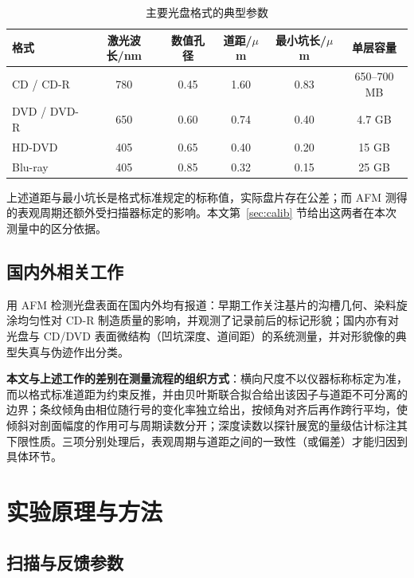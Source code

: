 \documentclass[12pt,a4paper,fontset=windows]{ctexart}
\begin{document}
\begin{table}[H]
\centering
\caption{主要光盘格式的典型参数}
\label{tab:format}
\small
{}
\begin{tabular}{@{}lccccc@{}}
\toprule
格式 & 激光波长/nm & 数值孔径 & 道距/$\mu$m & 最小坑长/$\mu$m & 单层容量 \\
\midrule
CD / CD-R & 780 & 0.45 & 1.60 & 0.83 & 650--700 MB \\
DVD / DVD-R & 650 & 0.60 & 0.74 & 0.40 & 4.7 GB \\
HD-DVD & 405 & 0.65 & 0.40 & 0.20 & 15 GB \\
Blu-ray & 405 & 0.85 & 0.32 & 0.15 & 25 GB \\
\bottomrule
\end{tabular}
\end{table}

上述道距与最小坑长是格式标准规定的标称值，实际盘片存在公差；而 AFM 测得的表观周期还额外受扫描器标定的影响。本文第~\ref{sec:calib} 节给出这两者在本次测量中的区分依据。

\subsection{国内外相关工作}

用 AFM 检测光盘表面在国内外均有报道：早期工作关注基片的沟槽几何、染料旋涂均匀性对 CD-R 制造质量的影响，并观测了记录前后的标记形貌\cite{sunjielin2001}；国内亦有对光盘与 CD/DVD 表面微结构（凹坑深度、道间距）的系统测量\cite{yanyg2005,sunzhi2006}，并对形貌像的典型失真与伪迹作出分类\cite{lipeng2016}。

\textbf{本文与上述工作的差别在测量流程的组织方式}：横向尺度不以仪器标称标定为准，而以格式标准道距为约束反推，并由贝叶斯联合拟合给出该因子与道距不可分离的边界；条纹倾角由相位随行号的变化率独立给出，按倾角对齐后再作跨行平均，使倾斜对剖面幅度的作用可与周期读数分开；深度读数以探针展宽的量级估计标注其下限性质。三项分别处理后，表观周期与道距之间的一致性（或偏差）才能归因到具体环节。


\section{实验原理与方法}\label{sec:method}

\subsection{扫描与反馈参数}
\end{document}
